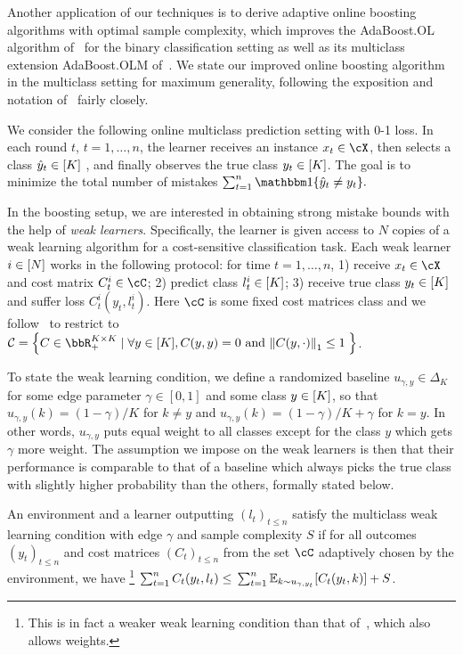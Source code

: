 
Another application of our techniques is to derive adaptive online boosting algorithms with optimal sample complexity,
which improves the AdaBoost.OL algorithm of~\citet{beygelzimer2015optimal} for the binary classification setting
as well as its multiclass extension AdaBoost.OLM of~\citet{jung2017onlinemulticlass}.
We state our improved online boosting algorithm in the multiclass setting for maximum generality,
following the exposition and notation of~\citet{jung2017onlinemulticlass} fairly closely.

We consider the following online multiclass prediction setting with 0-1 loss.
In each round $t$, $t=1,\ldots,n$, the learner receives an instance $x_t\in\cX$, then selects a class $\hat{y}_t \in [K]$ ,
and finally observes the true class $y_t \in[K]$. The goal is to minimize the total number of mistakes
$
\sum_{t=1}^{n}\ind\crl*{\yh_t\neq{}y_t}.
$

In the boosting setup, we are interested in obtaining strong mistake bounds with the help of \emph{weak learners}.
Specifically, the learner is given access to $N$ copies of a weak learning algorithm for a cost-sensitive classification task.
Each weak learner $i\in[N]$ works in the following protocol:
for time $t=1,\ldots,n$, 1) receive $x_t\in\cX$ and cost matrix $C_{t}^{i} \in \cC$;
2) predict class $l_t^{i}\in[K]$;
3) receive true class $y_t\in[K]$ and suffer loss $C_{t}^i(y_t, l_t^i)$. Here $\cC$ is some fixed cost matrices class and we follow~\citep{jung2017onlinemulticlass} to restrict to $\mc{C} = \crl*{C\in\bbR_+^{K\times{}K}\mid{} \forall{}y \in [K], C(y,y) = 0 \text{ and }  \nrm*{C(y, \cdot)}_{1}\leq{}1\;}$.

To state the weak learning condition, we define a randomized baseline $u_{\gamma,y}\in\Delta_{K}$ 
for some edge parameter $\gamma \in [0,1]$ and some class $y \in[K]$,
so that $u_{\gamma,y}(k) = (1-\gamma)/K$ for $k\neq{}y$
and $u_{\gamma,y}(k) = (1-\gamma)/K + \gamma$ for $k=y$.
In other words, $u_{\gamma,y}$ puts equal weight to all classes except for the class $y$ which gets $\gamma$ more weight.
The assumption we impose on the weak learners is then that their performance is comparable to that of 
a baseline which always picks the true class with slightly higher probability than the others, formally stated below.
\begin{definition}
\label{def:WLC}
An environment and a learner outputting $(l_t)_{t\leq{}n}$ satisfy the multiclass weak learning condition 
with edge $\gamma$ and sample complexity $S$ if for all outcomes $(y_t)_{t\leq{}n}$ and cost matrices $(C_{t})_{t\leq{}n}$ from the set $\cC$
adaptively chosen by the environment, we have%
\footnote{This is in fact a weaker weak learning condition than that of~\citep{jung2017onlinemulticlass}, which also allows weights.}
$\sum_{t=1}^{n}C_{t}(y_t, l_t) \leq{} \sum_{t=1}^{n}\En_{k\sim{}u_{\gamma, y_{t}}}\brk*{C_{t}(y_t, k)} + S$.
\end{definition}

